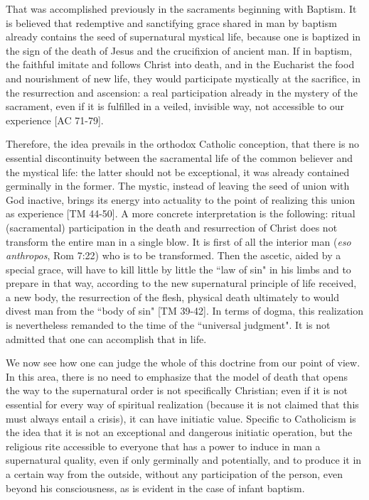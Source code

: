 That was accomplished previously in the sacraments beginning with Baptism. It is believed that redemptive and sanctifying grace shared in man by baptism already contains the seed of supernatural mystical life, because one is baptized in the sign of the death of Jesus and the crucifixion of ancient man. If in baptism, the faithful imitate and follows Christ into death, and in the Eucharist the food and nourishment of new life, they would participate mystically at the sacrifice, in the resurrection and ascension: a real participation already in the mystery of the sacrament, even if it is fulfilled in a veiled, invisible way, not accessible to our experience [AC 71-79].

Therefore, the idea prevails in the orthodox Catholic conception, that there is no essential discontinuity between the sacramental life of the common believer and the mystical life: the latter should not be exceptional, it was already contained germinally in the former. The mystic, instead of leaving the seed of union with God inactive, brings its energy into actuality to the point of realizing this union as experience [TM 44-50]. A more concrete interpretation is the following: ritual (sacramental) participation in the death and resurrection of Christ does not transform the entire man in a single blow. It is first of all the interior man (\textit{eso anthropos}, Rom 7:22) who is to be transformed. Then the ascetic, aided by a special grace, will have to kill little by little the ``law of sin" in his limbs and to prepare in that way, according to the new supernatural principle of life received, a new body, the resurrection of the flesh, physical death ultimately to would divest man from the ``body of sin" [TM 39-42]. In terms of dogma, this realization is nevertheless remanded to the time of the ``universal judgment". It is not admitted that one can accomplish that in life.

We now see how one can judge the whole of this doctrine from our point of view. In this area, there is no need to emphasize that the model of death that opens the way to the supernatural order is not specifically Christian; even if it is not essential for every way of spiritual realization (because it is not claimed that this must always entail a crisis), it can have initiatic value. Specific to Catholicism is the idea that it is not an exceptional and dangerous initiatic operation, but the religious rite accessible to everyone that has a power to induce in man a supernatural quality, even if only germinally and potentially, and to produce it in a certain way from the outside, without any participation of the person, even beyond his consciousness, as is evident in the case of infant baptism.

